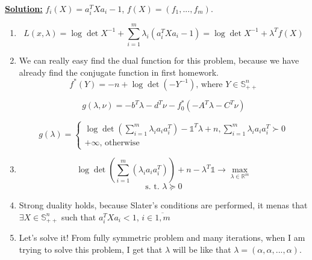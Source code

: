 \underline{\textbf{Solution:}}
$f_i(X) = a_i^TXa_i - 1$, $f(X) = (f_1, ..., f_m)$.
\begin{enumerate}
\item
\begin{equation*}
    L(x, \lambda) = \log \det X^{-1} + \sum\limits_{i=1}^m \lambda_i (a_i^TXa_i - 1)= \log \det X^{-1} + \lambda^T f(X)
\end{equation*}

\item  We can really easy find the dual function for this problem, because we have already find the conjugate function in first homework.
\begin{equation*}
    f^*(Y) = -n + \log \det(-Y^{-1}) \text{, where } Y \in \mathds{S}_{++}^n
\end{equation*}

\begin{equation*}
    g(\lambda, \nu) = -b^T\lambda - d^T\nu - f_0^*(-A^T\lambda-C^T\nu)
\end{equation*}

\begin{equation*}
    g(\lambda) = \begin{cases}
     \log \det \left( \sum\limits_{i=1}^m \lambda_i a_ia_i^T \right) 
      - \mathds{1}^T \lambda + n, \sum\limits_{i=1}^m \lambda_i a_ia_i^T \succ 0 \\
      
     +\infty \text{, otherwise}
    \end{cases}
\end{equation*}


\item

\begin{equation*}
    \log \det \left(\sum\limits_{i=1}^m(\lambda_i a_ia_i^T) \right) + n - \lambda^T\mathds{1} \rightarrow \max_{\lambda \in \mathds{R}^m}
\end{equation*}
\begin{equation*}
    \text{s. t. } \lambda \succcurlyeq 0
\end{equation*}

\item Strong duality holds, because Slater's conditions are performed, it menas that $\exists X \in \mathds{S}_{++}^n$ such that $a_i^TXa_i < 1$, $i \in \overline{1, m}$

\item Let's solve it! From fully symmetric problem and many iterations, when I am trying to solve this problem, I get that $\lambda $ will be like that $\lambda = (\alpha, \alpha, ..., \alpha)$.


\end{enumerate}

